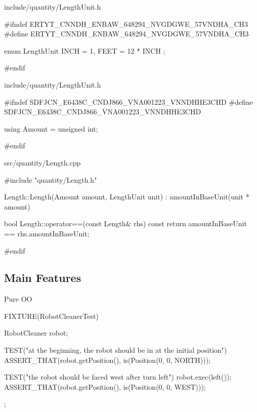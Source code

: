 \begin{frame}[fragile]{include/quantity/LengthUnit.h}
\begin{c++}
#ifndef ERTYT_CNNDH_ENBAW_648294_NVGDGWE_57VNDHA_CH3
#define ERTYT_CNNDH_ENBAW_648294_NVGDGWE_57VNDHA_CH3

enum LengthUnit 
{ 
    INCH = 1, 
    FEET = 12 * INCH 
};

#endif
\end{c++}
\end{frame}

\begin{frame}[fragile]{include/quantity/LengthUnit.h}
\begin{c++}
#ifndef SDFJCN_E6438C_CNDJ866_VNA001223_VNNDHHE3CHD
#define SDFJCN_E6438C_CNDJ866_VNA001223_VNNDHHE3CHD

using Amount = unsigned int;

#endif
\end{c++}
\end{frame}

\begin{frame}[fragile]{src/quantity/Length.cpp}
\begin{c++}
#include "quantity/Length.h"

Length::Length(Amount amount, LengthUnit unit)
  : amountInBaseUnit(unit * amount)
{
}

bool Length::operator==(const Length& rhs) const
{
    return amountInBaseUnit == rhs.amountInBaseUnit;
}

#endif
\end{c++}
\end{frame}

\subsection{Main Features}

\begin{frame}[fragile]{Pure OO}
\begin{c++}
FIXTURE(RobotCleanerTest)
{
    RobotCleaner robot;

    TEST("at the beginning, the robot should be in at the initial position")
    {
        ASSERT_THAT(robot.getPosition(), is(Position(0, 0, NORTH)));
    }

    TEST("the robot should be faced west after turn left")
    {
        robot.exec(left());
        ASSERT_THAT(robot.getPosition(), is(Position(0, 0, WEST)));
    }
};
\end{c++}
\end{frame}

